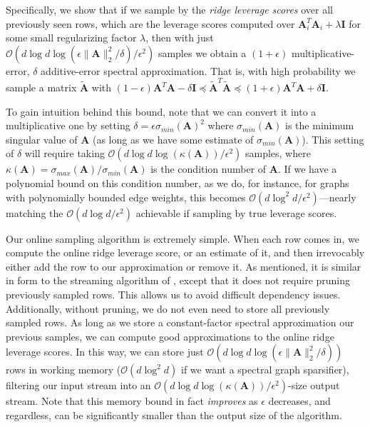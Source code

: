 \documentclass[11pt]{article}
\numberwithin{equation}{section}
\theoremstyle{definition}
\theoremstyle{plain}
\newcommand{\Oh}{\ensuremath{\mathcal{O}}}
\newcommand{\bv}[1]{\mathbf{#1}}
\newcommand{\norm}[1]{\|#1\|}
\begin{document}
Specifically, we show that if we sample by the \emph{ridge leverage scores} \cite{alaoui2014fast} over all previously seen rows, which are the leverage scores computed over $\bv{A}_i^T \bv{A}_i + \lambda \bv I$ for some small regularizing factor $\lambda$, then with just $\Oh(d \log d \log (\epsilon\norm{\bv A}_2^2/\delta) / \epsilon^2)$ samples we obtain a $(1+\epsilon)$ multiplicative-error, $\delta$ additive-error spectral approximation. That is, with high probability we sample a matrix $\bv{\tilde A}$ with $(1-\epsilon)\bv{A}^T\bv{A} - \delta\bv{I} \preceq \bv{\tilde{A}}^T\bv{\tilde{A}} \preceq (1+\epsilon)\bv{A}^T\bv{A} + \delta\bv{I}$.

To gain intuition behind this bound, note that we can convert it into a multiplicative one by setting $\delta = \epsilon \sigma_{min}(\bv{A})^2$ where $\sigma_{min}(\bv{A})$ is the minimum singular value of $\bv{A}$ (as long as we have some estimate of $\sigma_{min}(\bv{A})$). This setting of $\delta$ will require taking $\Oh(d \log d \log (\kappa(\bv A)) / \epsilon^2)$ samples, where $\kappa(\bv{A}) = \sigma_{max}(\bv{A})/\sigma_{min}(\bv{A})$ is the condition number of $\bv{A}$. If we have a polynomial bound on this condition number, as we do, for instance, for graphs with polynomially bounded
%
edge    %
weights, this becomes $\Oh(d \log^2 d / \epsilon^2)$---nearly matching the  $\Oh(d \log d / \epsilon^2)$ achievable if sampling by true leverage scores.

Our online sampling algorithm is extremely simple. When each row comes in, we compute the online ridge leverage score, or an estimate of it, and then irrevocably either add the row to our approximation or remove it. As mentioned, it is similar in form to the streaming algorithm of \cite{kelner2013spectral}, except that it does not require pruning previously sampled rows.
This allows us to avoid difficult dependency issues. Additionally, without pruning, we do not even need to store all previously sampled rows. As long as we store a constant-factor spectral approximation our previous samples, we can compute good approximations to the online ridge leverage scores. In this way, we can store just $\Oh(d \log d \log (\epsilon \norm{\bv A}_2^2/\delta) )$ rows in working memory ($\Oh(d\log^2 d)$ if we want a spectral graph sparsifier), filtering our input stream into an $\Oh(d \log d \log (\kappa(\bv A)) / \epsilon^2)$-size output stream. Note that this memory bound in fact \emph{improves} as $\epsilon$ decreases, and regardless, can be significantly smaller than the output size of the algorithm.
\end{document}
